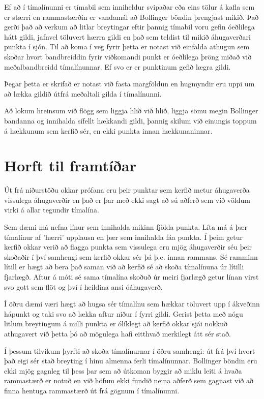 \documentclass{article}
\begin{document}
Ef að í tímalínunni er tímabil sem inniheldur svipaðar
eða eins tölur á kafla sem er stærri en rammastærðin er
vandamál að Bollinger 
böndin þrengjast mikið. Það gerði það að verkum að
litlar breytingar eftir þannig tímabil voru gefin
óeðlilega hátt gildi, 
jafnvel töluvert hærra gildi en það sem teldist til
mikið áhugaverðari punkta í sjón. Til að koma í veg
fyrir þetta er notast við
einfalda athugun sem skoðar hvort bandbreiddin fyrir
viðkomandi punkt er óeðlilega þröng miðað við
meðalbandbreidd tímalínunnar.
Ef svo er er punktinum gefið lægra gildi. 

{
  \color{red}
Þegar þetta er skrifað er notast við fasta margföldun en hugmyndir
eru uppi um að lækka 
gildið útfrá meðaltali gilda í tímalínunni.
}

Að lokum hreinsum við flögg sem liggja hlið við hlið,
liggja sömu megin Bollinger bandanna og innihalda
sífellt hækkandi gildi, 
þannig skilum við einungis toppum á hækkunum sem kerfið
sér, en ekki punkta innan hækkunaninnar.

\section{Horft til framtíðar}
Út frá niðurstöðu okkar prófana eru þeir punktar sem kerfið metur
áhugaverða vissulega áhugaverðir en það er þar með ekki sagt að
sú aðferð sem við völdum virki á allar tegundir tímalína. 

Sem dæmi má nefna línur sem innihalda mikinn fjölda punkta.
Líta má á þær tímalínur af 'hærri' upplausn en þær sem innihalda fáa punkta. Í
þeim getur kerfið okkar verið að flagga punkta sem vissulega eru mjög
áhugaverðir séu þeir skoðaðir í því samhengi sem kerfið okkar sér þá þ.e. innan
rammans. Sé ramminn lítill er hægt að bera það saman við að kerfið sé að skoða
tímalínuna úr lítilli fjarlægð. Aftur á móti sé sama tímalína skoðuð úr meiri
fjarlægð getur línan virst svo gott sem flöt og því í heildina ansi óáhugaverð.

Í öðru dæmi væri hægt að hugsa sér tímalínu sem hækkar töluvert upp í ákveðinn
hápunkt og taki svo að lækka aftur niður í fyrri gildi. Gerist þetta með nógu
litlum breytingum á milli punkta er ólíklegt að kerfið okkar sjái nokkuð
athugavert við þetta þó að mögulega hafi eitthvað merkilegt átt sér stað. 

Í þessum tilvikum þyrfti að skoða tímalínurnar í öðru samhengi: út frá því hvort
það eigi sér stað breyting í hinu almenna ferli tímalínunnar. Bollinger böndin
eru ekki mjög gagnleg til þess þar sem að útkoman byggir að miklu leiti á hvaða
rammastærð er notuð en við höfum ekki fundið neina aðferð sem gagnast við að
finna hentuga rammastærð út frá gögnum í tímalínunni.
\end{document}
